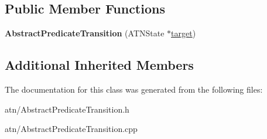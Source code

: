 \subsection*{Public Member Functions}
\begin{DoxyCompactItemize}
\item 
\mbox{\label{classantlr4_1_1atn_1_1AbstractPredicateTransition_a063926aaf5651de84080aaa801e67e50}} 
{\bfseries Abstract\+Predicate\+Transition} (A\+T\+N\+State $\ast$\hyperlink{classantlr4_1_1atn_1_1Transition_aaaed7f4ddda71e156b36de33e88f66a7}{target})
\end{DoxyCompactItemize}
\subsection*{Additional Inherited Members}


The documentation for this class was generated from the following files\+:\begin{DoxyCompactItemize}
\item 
atn/Abstract\+Predicate\+Transition.\+h\item 
atn/Abstract\+Predicate\+Transition.\+cpp\end{DoxyCompactItemize}
